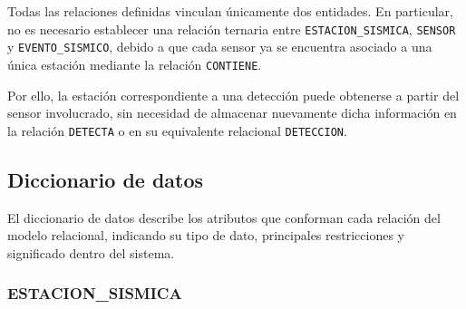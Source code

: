 \documentclass[12pt,a4paper]{article}
\begin{document}
Todas las relaciones definidas vinculan únicamente dos entidades. En particular, no es necesario establecer una relación ternaria entre \texttt{ESTACION\_\allowbreak{}SISMICA}, \texttt{SENSOR} y \texttt{EVENTO\_\allowbreak{}SISMICO}, debido a que cada sensor ya se encuentra asociado a una única estación mediante la relación \texttt{CONTIENE}.

Por ello, la estación correspondiente a una detección puede obtenerse a partir del sensor involucrado, sin necesidad de almacenar nuevamente dicha información en la relación \texttt{DETECTA} o en su equivalente relacional \texttt{DETECCION}.


\subsection{Diccionario de datos}

El diccionario de datos describe los atributos que conforman cada relación del modelo relacional, indicando su tipo de dato, principales restricciones y significado dentro del sistema.


\subsubsection*{ESTACION\_SISMICA}
\end{document}
